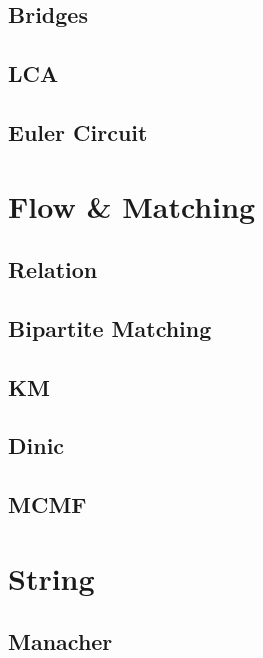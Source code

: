     \subsection{Bridges}
        
    \subsection{LCA}
        
    \subsection{Euler Circuit}
        

\section{Flow \& Matching}
    \subsection{Relation}
        
    \subsection{Bipartite Matching}
        
    \subsection{KM}
        
    \subsection{Dinic}
        
    \subsection{MCMF}
        

\section{String}
    \subsection{Manacher}
        
